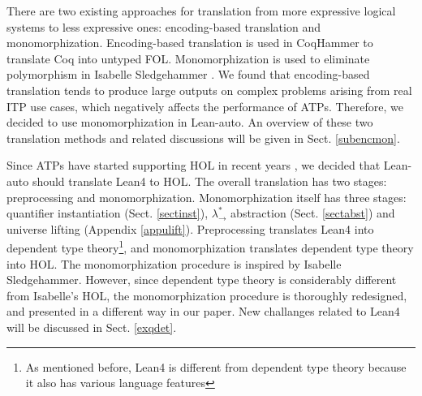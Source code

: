   There are two existing approaches for translation from more expressive
  logical systems to less expressive ones: encoding-based translation and monomorphization.
  Encoding-based translation is used in CoqHammer \cite{Czajka2018HammerFC}
  to translate Coq into untyped FOL. Monomorphization is used to
  eliminate polymorphism in Isabelle Sledgehammer \cite{Blanchette2016HammeringTQ,MonoPaper,Paulson2012ThreeYO}.
  We found that encoding-based translation tends to produce large outputs
  on complex problems arising from real ITP use cases, which negatively affects the performance of ATPs.
  Therefore, we decided to use monomorphization in Lean-auto. An overview of these two
  translation methods and related discussions will be given in Sect. \ref{subencmon}.

  Since ATPs have started supporting HOL in recent years \cite{HOVampire,ZipperpositionMakeWork,HOEProver},
  we decided that Lean-auto should translate Lean4 to HOL. The overall translation has
  two stages: preprocessing %
  and monomorphization.
  Monomorphization itself has three stages: quantifier instantiation (Sect. \ref{sectinst}),
  $\lambda_\to^*$ abstraction (Sect. \ref{sectabst}) and universe lifting (Appendix \ref{appulift}).
  Preprocessing translates Lean4 into dependent type
  theory\footnote{As mentioned before, Lean4 is different from
  dependent type theory because it also has various language features},
  and monomorphization translates dependent type theory into HOL.
  The monomorphization procedure is inspired by Isabelle Sledgehammer.
  However, since dependent type theory is considerably different from
  Isabelle's HOL, the monomorphization procedure is thoroughly redesigned,
  and presented in a different way in our paper. New challanges related to
  Lean4 will be discussed in Sect. \ref{exqdet}.
